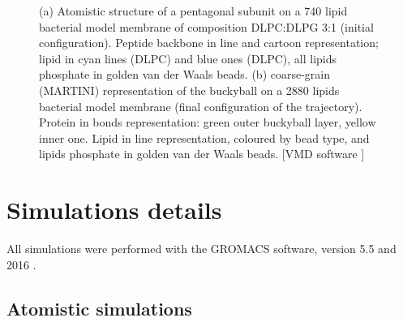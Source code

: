 \begin{figure}[t]
\centering
{}
\caption[Snapshot of simulations of capzip on model membranes]{(a) Atomistic structure of a pentagonal subunit on a 740 lipid bacterial model membrane of composition DLPC:DLPG 3:1 (initial configuration). Peptide backbone in line and cartoon representation; lipid in cyan lines (DLPC) and blue ones (DLPC), all lipids phosphate in golden van der Waals beads. (b) coarse-grain (MARTINI) representation of the buckyball on a 2880 lipids bacterial model membrane (final configuration of the trajectory). Protein in bonds representation: green outer buckyball layer, yellow inner one. Lipid in line representation, coloured by bead type, and lipids phosphate in golden van der Waals beads. [VMD software \citet{HUMP96}]}
\label{fig:pL6_vmd}
\end{figure}
\section{Simulations details} \label{sec:details}

All simulations were performed with the GROMACS software, version 5.5 and 2016 \citep{Berendsen1995,Abraham2015,gromacs_man}. 

\subsection{Atomistic simulations}
